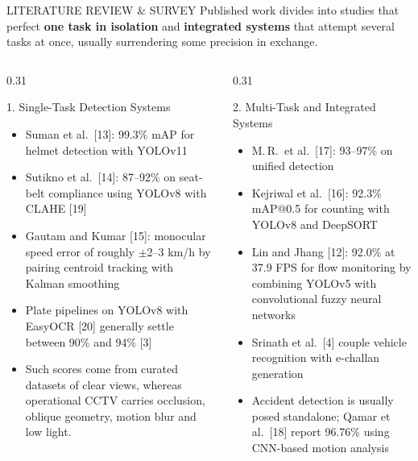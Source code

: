 \documentclass[aspectratio=169,10pt,t]{beamer}
\begin{document}
\begin{frame}{LITERATURE REVIEW \& SURVEY}
\fontsize{6.4}{7.5}\selectfont
Published work divides into studies that perfect \textbf{one task in isolation} and \textbf{integrated systems} that
attempt several tasks at once, usually surrendering some precision in exchange.
\vspace{0.1em}
\begin{columns}[T,onlytextwidth]
\begin{column}{0.31\textwidth}
\begin{block}{1. Single-Task Detection Systems}
\begin{itemize}\setlength{\itemsep}{0.1em}
  \item Suman et al.\ [13]: 99.3\% mAP for helmet detection with YOLOv11
  \item Sutikno et al.\ [14]: 87--92\% on seat-belt compliance using YOLOv8 with CLAHE [19]
  \item Gautam and Kumar [15]: monocular speed error of roughly $\pm$2--3 km/h by pairing centroid tracking with
        Kalman smoothing
  \item Plate pipelines on YOLOv8 with EasyOCR [20] generally settle between 90\% and 94\% [3]
  \item Such scores come from curated datasets of clear views, whereas operational CCTV carries occlusion, oblique
        geometry, motion blur and low light.
\end{itemize}
\end{block}
\end{column}
\begin{column}{0.31\textwidth}
\begin{block}{2. Multi-Task and Integrated Systems}
\begin{itemize}\setlength{\itemsep}{0.1em}
  \item M.\,R.\ et al.\ [17]: 93--97\% on unified detection
  \item Kejriwal et al.\ [16]: 92.3\% mAP@0.5 for counting with YOLOv8 and DeepSORT
  \item Lin and Jhang [12]: 92.0\% at 37.9 FPS for flow monitoring by combining YOLOv5 with convolutional fuzzy
        neural networks
  \item Srinath et al.\ [4] couple vehicle recognition with e-challan generation
  \item Accident detection is usually posed standalone; Qamar et al.\ [18] report 96.76\% using CNN-based motion
        analysis

\end{itemize}
\end{block}
\end{column}
\end{columns}
\end{frame}
\end{document}
